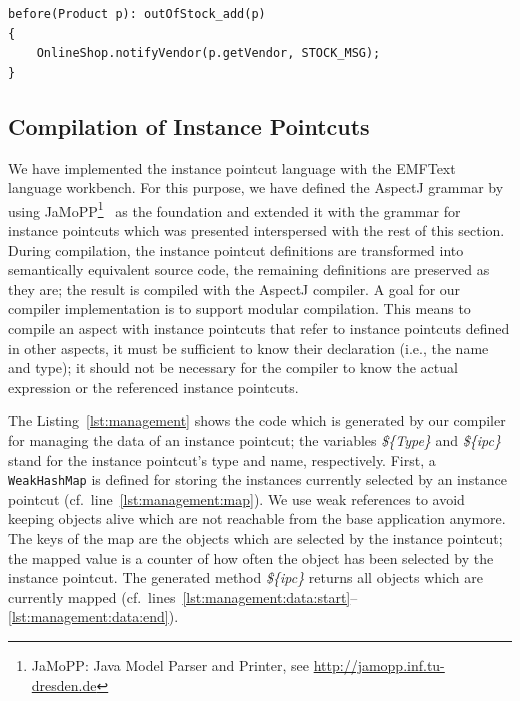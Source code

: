 \documentclass{acm_proc_article-sp}
\begin{document}
\begin{lstlisting}[float=h!, caption={Set monitoring pointcut used to notify vendors}, label={lst:monitor1}]
before(Product p): outOfStock_add(p)
{
	OnlineShop.notifyVendor(p.getVendor, STOCK_MSG);
}
\end{lstlisting}

\subsection{Compilation of Instance Pointcuts}


We have implemented the instance pointcut language with the EMFText language workbench.
For this purpose, we have defined the AspectJ grammar by using JaMoPP\footnote{JaMoPP: Java Model Parser and Printer, see \url{http://jamopp.inf.tu-dresden.de}}~\cite{jamopp2010} as the foundation and extended it with the grammar for instance pointcuts which was presented interspersed with the rest of this section.
During compilation, the instance pointcut definitions are transformed into semantically equivalent source code, the remaining definitions are preserved as they are; the result is compiled with the AspectJ compiler.
A goal for our compiler implementation is to support modular compilation.
This means to compile an aspect with instance pointcuts that refer to instance pointcuts defined in other aspects, it must be sufficient to know their declaration (i.e., the name and type); it should not be necessary for the compiler to know the actual expression or the referenced instance pointcuts.

The Listing~\ref{lst:management} shows the code which is generated by our compiler for managing the data of an instance pointcut; the variables \emph{\$\{Type\}} and \emph{\$\{ipc\}} stand for the instance pointcut's type and name, respectively.
First, a \lstinline{WeakHashMap} is defined for storing the instances currently selected by an instance pointcut (cf.\ line~\ref{lst:management:map}).
We use weak references to avoid keeping objects alive which are not reachable from the base application anymore.
The keys of the map are the objects which are selected by the instance pointcut; the mapped value is a counter of how often the object has been selected by the instance pointcut.
The generated method \emph{\$\{ipc\}} returns all objects which are currently mapped (cf.\ lines~\ref{lst:management:data:start}--\ref{lst:management:data:end}).
\end{document}
